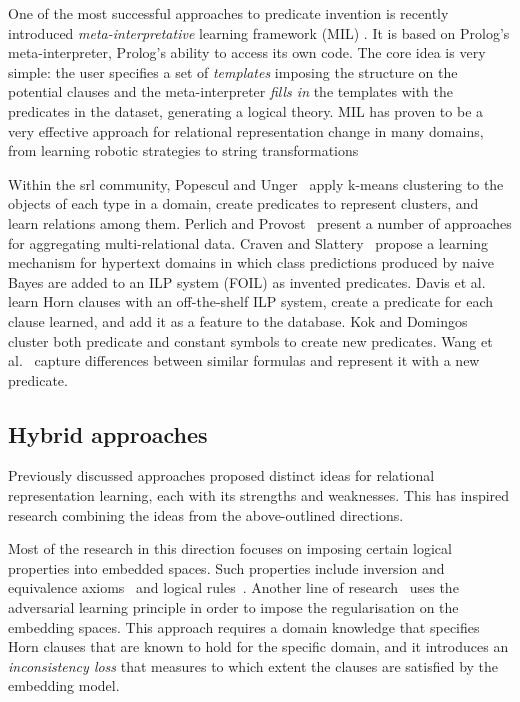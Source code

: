 One of the most successful approaches to predicate invention is recently introduced \textit{meta-interpretative} learning framework (MIL) \cite{MuggletonMIL,Cropper2018,Cropper:2015}.
It is based on Prolog's meta-interpreter, Prolog's ability to access its own code.
The core idea is very simple: the user specifies a set of \textit{templates} imposing the structure on the potential clauses and the meta-interpreter \textit{fills in} the templates with the predicates in the dataset, generating a logical theory.
MIL has proven to be a very effective approach for relational representation change in many domains, from learning robotic strategies to string transformations \cite{Cropper2015LearningEL,DBLP:journals/ml/MuggletonDSTWZ18,DBLP:conf/ilp/CropperTM15}



Within the \gls{srl} community,  Popescul and Unger~\cite{Popescul2004} apply k-means clustering to the objects of each type in a domain, create predicates to represent clusters, and learn relations among them.
Perlich and Provost~\cite{Perlich2003} present a number of approaches for aggregating multi-relational data.
Craven and Slattery~\cite{Craven2001} propose a learning mechanism for hypertext domains in which class predictions produced by naive Bayes are added to an ILP system (FOIL) as invented predicates.
Davis et al.~\cite{DavisOSBPC07} learn Horn clauses with an off-the-shelf ILP system, create a predicate for each clause learned, and add it as a feature to the database.
Kok and Domingos~\cite{Kok2007} cluster both predicate and constant symbols to create new predicates.
Wang et al.~\cite{WangMC15} capture differences between similar formulas and represent it with a new predicate.



\subsection{Hybrid approaches}


Previously discussed approaches proposed distinct ideas for relational representation learning, each with its strengths and weaknesses.
This has inspired research combining the ideas from the above-outlined directions.


Most of the research in this direction focuses on imposing certain logical properties into embedded spaces.
Such properties include inversion and equivalence axioms~\cite{DBLP:conf/pkdd/MinerviniCMNV17} and logical rules~\cite{demeester2016lifted,N15-1118,W14-2409}.
Another line of research~\cite{DBLP:conf/uai/MinerviniDRR17} uses the adversarial learning principle in order to impose the regularisation on the embedding spaces.
This approach requires a domain knowledge that specifies Horn clauses that are known to hold for the specific domain, and it introduces an \textit{inconsistency loss} that measures to which extent the clauses are satisfied by the embedding model.




